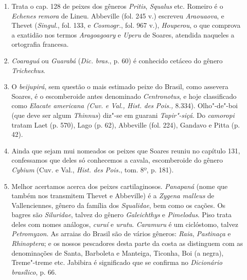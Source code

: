 \begin{enumerate}
\pagebreak

\begin{verse}
\textit{Che sotto l'acqua è gente che sospira,\\ 
E fanno pullular quest'acqua al summo.} \\*
\end{verse}
As assaltadas de que se faz menção seriam talvez obra de tubarões ou de jacarés, uma 
vez que por ali não consta haver focas.

\item Trata o cap. 128 de peixes dos gêneros \textit{Pritis}, \textit{Squalus} etc. Romeiro é o \textit{Echenes 
remora} de Lineu. Abbeville (fol. 245 v.) escreveu \textit{Araouaova}, e Thevet (\textit{Singul.}, fol. 
133, e  \textit{Cosmogr.}, fol. 967 v.), \textit{Houperou}, o que comprova a exatidão nos termos \textit{Aragoagoary} 
e \textit{Uperu} de Soares, atendida naqueles a ortografia francesa.

\item \textit{Coaraguá} ou \textit{Guarabá} (\textit{Dic. bras.}, p. 60) é conhecido cetáceo do gênero  \textit{Trichechus}.

\item O \textit{beijupirá}, sem questão o mais estimado peixe do Brasil, como assevera Soares, 
é o escomberoide antes denominado \textit{Centronotus}, e hoje classificado como 
\textit{Elacate americana (Cuv. e Val., Hist. des Pois.,} 8.334).
Olho"-de"-boi (que deve ser algum \textit{Thinnus}) diz"-se em guarani \textit{Tapir"-siçá}. Do \textit{camoropi} 
tratam Laet (p. 570), Lago (p. 62), Abbeville (fol. 224), Gandavo e Pitta (p. 42).

\item  Ainda que sejam mui nomeados os peixes que Soares reuniu no
capítulo 131, confessamos que deles só conhecemos a cavala, escomberoide
do gênero \textit{Cybium} (Cuv. e Val., \textit{Hist. des Pois.}, tom. 8º, p. 181).

\item  Melhor acertamos acerca dos peixes cartilaginosos. \textit{Panapaná}
(nome que também nos transmitem Thevet e Abbeville) é a \textit{Zygena malleus}
de Vallenciennes, gênero da família dos \textit{Squalidae}, bem como os cações. Os
bagres são \textit{Siluridae}, talvez do gênero \textit{Galeichthys} e \textit{Pimelodus}. Piso trata
deles com nomes análogos, \textit{curuí} e \textit{urutu}. \textit{Caramuru} é um ciclóstomo, talvez \textit{Petromyzon}. 
As arraias do Brasil são de vários gêneros: \textit{Raia}, \textit{Pastinaça} e
\textit{Rhinoptera}; e os nossos pescadores desta parte da costa as distinguem com
as denominações de Santa, Barboleta e Manteiga, Ticonha, Boi (a negra),
Treme"-treme etc. Jabibira é significado que se confirma no \textit{Dicionário brasílico}, p. 66.


\end{enumerate}
